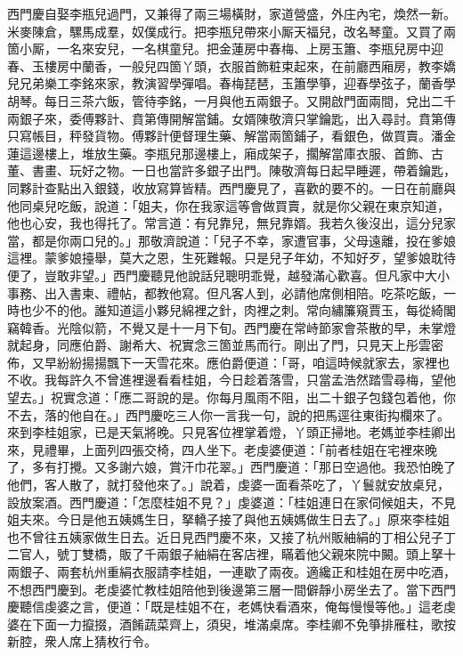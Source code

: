 西門慶自娶李瓶兒過門，又兼得了兩三場橫財，家道營盛，外庄內宅，煥然一新。米麥陳倉，騾馬成羣，奴僕成行。把李瓶兒帶來小厮天福兒，改名琴童。又買了兩箇小厮，一名來安兒，一名棋童兒。把金蓮房中春梅、上房玉簫、李瓶兒房中迎春、玉樓房中蘭香，一般兒四箇丫頭，衣服首飾粧束起來，在前廳西廂房，教李嬌兒兄弟樂工李銘來家，教演習學彈唱。{}春梅琵琶，玉簫學箏，迎春學弦子，蘭香學胡琴。每日三茶六飯，管待李銘，一月與他五兩銀子。又開啟門面兩間，兌出二千兩銀子來，委傅夥計、賁第傳開解當鋪。女婿陳敬濟只掌鑰匙，出入尋討。賁第傳只寫帳目，秤發貨物。傅夥計便督理生藥、解當兩箇鋪子，看銀色，做買賣。潘金蓮這邊樓上，堆放生藥。李瓶兒那邊樓上，廂成架子，擱解當庫衣服、首飾、古董、書畫、玩好之物。一日也當許多銀子出門。陳敬濟每日起早睡遲，帶着鑰匙，同夥計查點出入銀錢，收放寫算皆精。西門慶見了，喜歡的要不的。一日在前廳與他同桌兒吃飯，說道：「姐夫，你在我家這等會做買賣，就是你父親在東京知道，他也心安，我也得托了。常言道：有兒靠兒，無兒靠婿。我若久後沒出，這分兒家當，都是你兩口兒的。」{}那敬濟說道：「兒子不幸，家遭官事，父母遠離，投在爹娘這裡。蒙爹娘擡舉，莫大之恩，生死難報。只是兒子年幼，不知好歹，望爹娘耽待便了，豈敢非望。」西門慶聽見他說話兒聰明乖覺，越發滿心歡喜。但凡家中大小事務、出入書柬、禮帖，都教他寫。但凡客人到，必請他席側相陪。吃茶吃飯，一時也少不的他。誰知道這小夥兒綿裡之針，肉裡之刺。常向繡簾窺賈玉，每從綺閣竊韓香。光陰似箭，不覺又是十一月下旬。西門慶在常峙節家會茶散的早，未掌燈就起身，同應伯爵、謝希大、祝實念三箇並馬而行。剛出了門，只見天上彤雲密佈，又早紛紛揚揚飄下一天雪花來。應伯爵便道：「哥，咱這時候就家去，家裡也不收。我每許久不曾進裡邊看看桂姐，今日趁着落雪，只當孟浩然踏雪尋梅，望他望去。」祝實念道：「應二哥說的是。你每月風雨不阻，出二十銀子包錢包着他，{}你不去，落的他自在。」西門慶吃三人你一言我一句，說的把馬逕往東街抅欄來了。來到李桂姐家，已是天氣將晚。只見客位裡掌着燈，丫頭正掃地。老媽並李桂卿出來，見禮畢，上面列四張交椅，四人坐下。老虔婆便道：「前者桂姐在宅裡來晚了，多有打攪。又多謝六娘，賞汗巾花翠。」西門慶道：「那日空過他。我恐怕晚了他們，客人散了，就打發他來了。」說着，虔婆一面看茶吃了，丫鬟就安放桌兒，設放案酒。西門慶道：「怎麼桂姐不見？」虔婆道：「桂姐連日在家伺候姐夫，不見姐夫來。今日是他五姨媽生日，拏轎子接了與他五姨媽做生日去了。」原來李桂姐也不曾往五姨家做生日去。近日見西門慶不來，又接了杭州販紬絹的丁相公兒子丁二官人，號丁雙橋，販了千兩銀子紬絹在客店裡，瞞着他父親來院中闝。頭上拏十兩銀子、兩套杭州重絹衣服請李桂姐，一連歇了兩夜。適纔正和桂姐在房中吃酒，不想西門慶到。老虔婆忙教桂姐陪他到後邊第三層一間僻靜小房坐去了。當下西門慶聽信虔婆之言，便道：「既是桂姐不在，老媽快看酒來，俺每慢慢等他。」這老虔婆在下面一力攛掇，酒餚蔬菜齊上，須臾，堆滿桌席。李桂卿不免箏排雁柱，歌按新腔，衆人席上猜枚行令。

